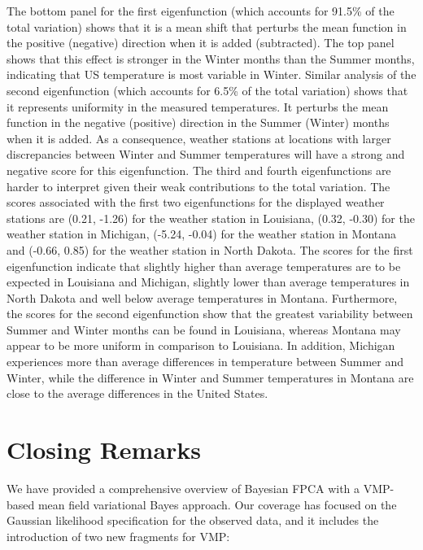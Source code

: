 \documentclass[12pt]{article}
\theoremstyle{plain}
\theoremstyle{definition}
\theoremstyle{remark}
\begin{document}
The bottom panel for the first eigenfunction (which accounts for 91.5\% of the total variation)
shows that it is a mean shift that perturbs the mean function in the positive
(negative) direction when it is added (subtracted). The top panel shows that this effect is stronger in the Winter months
than the Summer months, indicating that US temperature is most variable in Winter. Similar analysis of the
second eigenfunction (which accounts for 6.5\% of the total variation) shows that it represents uniformity in the measured
temperatures. It perturbs the mean function in the negative (positive) direction in the Summer (Winter) months when
it is added. As a consequence, weather stations at locations with larger discrepancies
between Winter and Summer temperatures will have a strong and negative score for this eigenfunction.
The third and fourth eigenfunctions are harder to interpret given their weak contributions to the
total variation. The scores associated with the first two eigenfunctions for the displayed weather stations are
(0.21, -1.26) for the weather station in Louisiana, (0.32, -0.30) for the weather station in Michigan, (-5.24, -0.04)
for the weather station in Montana and (-0.66, 0.85) for the weather station in North Dakota.
The scores for the first eigenfunction indicate that slightly higher than average temperatures
are to be expected in Louisiana and Michigan, slightly lower than average temperatures in North Dakota and well
below average temperatures in Montana. Furthermore, the scores for the second eigenfunction show that the
greatest variability between Summer and Winter months can be found
in Louisiana, whereas Montana may appear to be more uniform in comparison to Louisiana. In addition, Michigan
experiences more than average differences in temperature between Summer and Winter, while
the difference in Winter and Summer temperatures in Montana are close to the average differences in the
United States.


\section{Closing Remarks}
\label{sec:closing_remarks}

We have provided a comprehensive overview of Bayesian FPCA with a VMP-based mean field variational Bayes
approach. Our coverage has focused on the Gaussian likelihood specification for the observed data, and it
includes the introduction of two new fragments for VMP:
\end{document}
